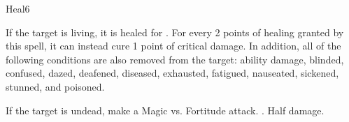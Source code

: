 \begin{spellsection}{Heal}{6}
    \begin{spellheader}
    \end{spellheader}
    \begin{spellcontent}
        \begin{spelltargetinginfo}
        \end{spelltargetinginfo}
        \begin{spelleffects}
            \spelleffect If the target is living, it is healed for . For every 2 points of healing granted by this spell, it can instead cure 1 point of critical damage. In addition, all of the following conditions are also removed from the target: ability damage, blinded, confused, dazed, deafened, diseased, exhausted, fatigued, nauseated, sickened, stunned, and poisoned.
            \begin{spellattacktriggered}{If the target is undead, make a Magic vs. Fortitude attack.}
                \spellsuccess {}.
                \spellfailure Half damage.
            \end{spellattacktriggered}
        \end{spelleffects}
    \end{spellcontent}
    \begin{spellfooter}
        \miscastrandom
    \end{spellfooter}
\end{spellsection}

